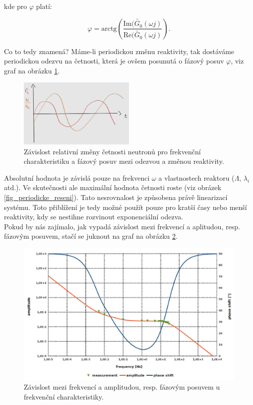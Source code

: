 kde pro $\varphi$ platí:

\begin{equation}
  \boxed{
  \varphi = \text{arctg} \left ( \dfrac{\text{Im} (\tilde{G_0}(\omega j)}{\text{Re}(\tilde{G_0}(\omega j)} \right ).
  \label{frekvencni_charakteristika_faze}}
\end{equation}

Co to tedy znamená? Máme-li periodickou změnu reaktivity, tak dostáváme periodickou odezvu na četnosti, která je ovšem posunutá o fázový posuv $\varphi$, viz graf na obrázku \ref{fig_frekvencni}.\\

\begin{figure}[H]
 \centering
 \includegraphics[width=0.5\textwidth]{img/frekvencni.jpg}
 \caption{Závislost relativní změny četnosti neutronů pro frekvenční charakteristiku a fázový posuv mezi odezvou a změnou reaktivity.}
 \label{fig_frekvencni}
\end{figure}

Absolutní hodnota je závislá pouze na frekvenci $\omega$ a vlastnostech reaktoru ($\Lambda$, $\lambda_i$ atd.). Ve skutečnosti ale maximální hodnota četnosti roste (viz obrázek \ref{fig_periodicke_reseni}). Tato nesrovnalost je způsobena právě linearizací systému. Toto přiblížení je tedy možné použít pouze pro kratší časy nebo menší reaktivity, kdy se nestihne rozvinout exponenciální odezva.\\

Pokud by nás zajímalo, jak vypadá závislost mezi frekvencí a aplitudou, resp. fázovým posuvem, stačí se juknout na graf na obrázku \ref{fig_frekvencni_zavislost}.

\begin{figure}[H]
  \centering
  \includegraphics[width=1\textwidth]{img/frekvencni_zavislost.jpg}
  \caption{Závislost mezi frekvencí a amplitudou, resp. fázovým posuvem u frekvenční charakteristiky.}
  \label{fig_frekvencni_zavislost}
\end{figure}

